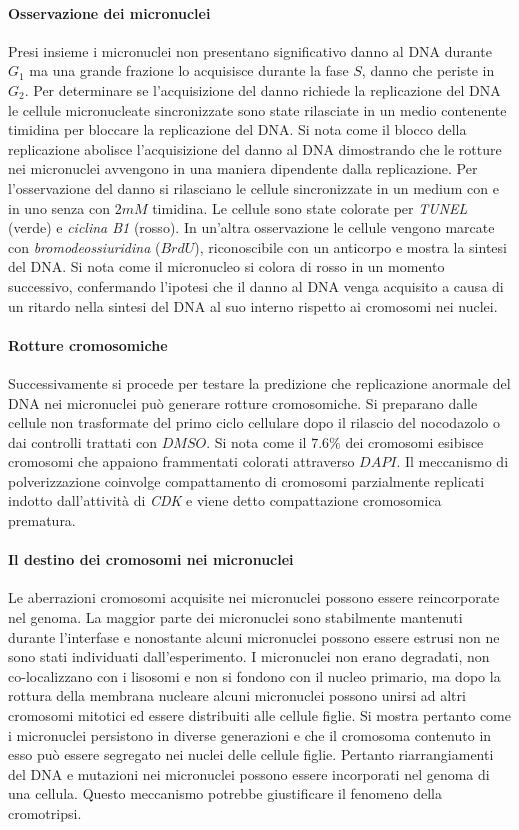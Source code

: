 \paragraph{Osservazione dei micronuclei}
Presi insieme i micronuclei non presentano significativo danno al DNA durante $G_1$ ma una grande frazione lo acquisisce durante la fase $S$, danno che periste in $G_2$. Per determinare
se l'acquisizione del danno richiede la replicazione del DNA le cellule micronucleate sincronizzate sono state rilasciate in un medio contenente timidina per bloccare la replicazione del
DNA. Si nota come il blocco della replicazione abolisce l'acquisizione del danno al DNA dimostrando che le rotture nei micronuclei avvengono in una maniera dipendente dalla replicazione.
Per l'osservazione del danno si rilasciano le cellule sincronizzate in un medium con e in uno senza con $2mM$ timidina. Le cellule sono state colorate per \emph{TUNEL} (verde) e 
\emph{ciclina B1} (rosso). In un'altra osservazione le cellule vengono marcate con \emph{bromodeossiuridina} ($BrdU$), riconoscibile con un anticorpo e mostra la sintesi del DNA. Si
nota come il micronucleo si colora di rosso in un momento successivo, confermando l'ipotesi che il danno al DNA venga acquisito a causa di un ritardo nella sintesi del DNA al suo interno
rispetto ai cromosomi nei nuclei. 
\paragraph{Rotture cromosomiche}
Successivamente si procede per testare la predizione che replicazione anormale del DNA nei micronuclei pu\`o generare rotture cromosomiche. Si preparano dalle cellule non trasformate
del primo ciclo cellulare dopo il rilascio del nocodazolo o dai controlli trattati con $DMSO$. Si nota come il $7.6\%$ dei cromosomi esibisce cromosomi che appaiono frammentati 
colorati attraverso $DAPI$. Il meccanismo di polverizzazione coinvolge compattamento di cromosomi parzialmente replicati indotto dall'attivit\`a di \emph{CDK} e viene detto compattazione
cromosomica prematura. 
\paragraph{Il destino dei cromosomi nei micronuclei}
Le aberrazioni cromosomi acquisite nei micronuclei possono essere reincorporate nel genoma. La maggior parte dei micronuclei sono stabilmente mantenuti durante l'interfase e nonostante
alcuni micronuclei possono essere estrusi non ne sono stati individuati dall'esperimento. I micronuclei non erano degradati, non co-localizzano con i lisosomi e non si fondono con 
il nucleo primario, ma dopo la rottura della membrana nucleare alcuni micronuclei possono unirsi ad altri cromosomi mitotici ed essere distribuiti alle cellule figlie. Si mostra
pertanto come i micronuclei persistono in diverse generazioni e che il cromosoma contenuto in esso pu\`o essere segregato nei nuclei delle cellule figlie. Pertanto riarrangiamenti 
del DNA e mutazioni nei micronuclei possono essere incorporati nel genoma di una cellula. Questo meccanismo potrebbe giustificare il fenomeno della cromotripsi. 
